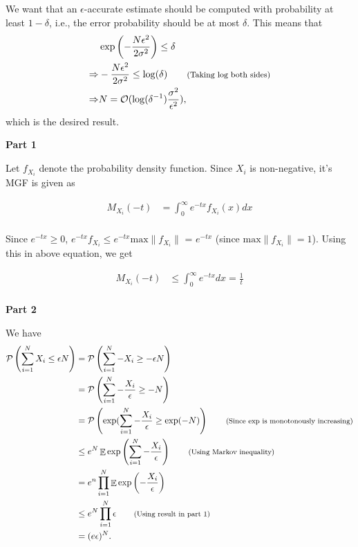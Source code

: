\documentclass[11pt]{article}
\newenvironment{exercise}[2][Exercise]{\begin{trivlist}
\item[\hskip \labelsep {\bfseries #1}\hskip \labelsep {\bfseries #2.}]}{\end{trivlist}}
\newenvironment{solution}[1][Solution]{\begin{trivlist}
\item[\hskip \labelsep {\bfseries #1}\hskip \labelsep]}{\end{trivlist}}
\DeclareMathOperator*{\E}{\mathbb{E}}
\newcommand*{\annot}[1]{\tag*{\footnotesize{(#1)}}}
\begin{document}
\begin{solution}
We want that an $\epsilon$-accurate estimate should be computed with probability at least $1-\delta$, i.e., the error probability should be at most $\delta$. This means that
\begin{align*}
&\exp \left( -\frac{N\epsilon^2}{2\sigma^2} \right) \leq \delta \\
\Rightarrow & -\frac{N\epsilon^2}{2\sigma^2} \leq \log (\delta) \annot{Taking log both sides}\\
\Rightarrow & N = \mathcal{O}(\log(\delta^{-1})\frac{\sigma^2}{\epsilon^2}),
\end{align*}
which is the desired result.
\end{solution}

\begin{exercise}{2.2.10}
\end{exercise}

\begin{solution}
\textbf{Part 1}

Let $f_{X_i}$ denote the probability density function. Since $X_i$ is non-negative, it's MGF is given as

\begin{align*}
M_{X_i}(-t) &= \int_{0}^{\infty} e^{-tx}f_{X_i}(x) dx \\
\end{align*}

Since $e^{-tx} \geq 0$, $e^{-tx}f_{X_i} \leq e^{-tx}\text{max}\lVert f_{X_i}\rVert$ = $e^{-tx}$ (since $\text{max}\lVert f_{X_i}\rVert = 1$). Using this in above equation, we get

\begin{align*}
M_{X_i}(-t) &\leq \int_{0}^{\infty} e^{-tx} dx = \frac{1}{t}\\
\end{align*}

\textbf{Part 2}

We have
\begin{align*}
\mathcal{P}\left( \sum_{i=1}^N X_i \leq \epsilon N \right) &= \mathcal{P}\left( \sum_{i=1}^N -X_i \geq -\epsilon N \right) \\
	&=  \mathcal{P}\left( \sum_{i=1}^N -\frac{X_i}{\epsilon} \geq -N \right) \\
	&= \mathcal{P}\left( \exp(\sum_{i=1}^N -\frac{X_i}{\epsilon} \geq \exp(-N) \right) \annot{Since exp is monotonously increasing}\\
	&\leq e^N \E \exp \left( \sum_{i=1}^N -\frac{X_i}{\epsilon} \right) \annot{Using Markov inequality}\\
	&= e^n \prod_{i=1}^N \E \exp \left( -\frac{X_i}{\epsilon} \right) \\
	&\leq e^N \prod_{i=1}^N \epsilon \annot{Using result in part 1} \\
	&= (e\epsilon)^N.
\end{align*}
\end{solution}
\end{document}
